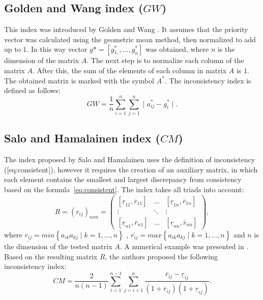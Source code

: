 \subsection{Golden and Wang index ($GW$)}

This index was introduced by Golden and Wang \cite{Golden1989}. It assumes that the priority vector was calculated using the geometric mean method, then normalized to add up to $1$. In this way vector $g*=[g{}_{1,}^{*},...,g_{n}^{*}]$ was obtained, where $n$ is the dimension of the matrix $A$. The next step is to normalize each column of the matrix $A$. After this, the sum of the elements of each column in matrix $A$ is $1$. The obtained matrix is marked with the symbol $A^{*}$. The inconsistency index is defined as follows:
	\begin{equation} 
		GW=\frac{1}{n}\sum_{i=1}^{n}\sum_{j=1}^{n}\mid a_{ij}^{*}-g_{i}^{*}\mid.
	 \end{equation}
 

\subsection{Salo and Hamalainen index ($CM$)}

The index proposed by Salo and Hamalainen \cite{SALO1995} uses the definition of inconsistency ([eq:consistent]), however it requires the creation of an auxiliary matrix, in which each element contains the smallest and largest discrepancy from consistency based on the formula~\ref{eq:consistent}. The index takes all triads into account:
	\begin{equation} 
		R=(r_{ij})_{nxn}=\left(\begin{array}{ccc}
			[\underline{r}_{11},\overline{r}_{11}] & \ldots & [\underline{r}_{1n},\overline{r}_{1n}]\\
			\vdots & \ddots & \vdots\\{}
			[\underline{r}_{n1},\overline{r}_{n1}] & \ldots & [\underline{r}_{nn},\overline{r}_{nn}]
		\end{array}\right),
	\end{equation}
 where $\underline{r_{ij}}=min\left\{ a_{ik}a_{kj}\mid k=1,\ldots,n\right\}$ , $\overline{r_{ij}}=max\left\{ a_{ik}a_{kj}\mid k=1,\ldots,n\right\}$ and $n$ is the dimension of the tested matrix $A$. A numerical example was presented in \cite{Brunelli2015}. Based on the resulting matrix $R$, the authors proposed the following inconsistency index:
 	\begin{equation} 
		CM=\frac{2}{n(n-1)}\sum_{i=1}^{n-1}\sum_{j=i+1}^{n}\frac{\overline{r}_{ij}-\underline{r}_{ij}}{\left(1+\overline{r}_{ij}\right)\left(1+\underline{r}_{ij}\right)}.
	 \end{equation}
 

